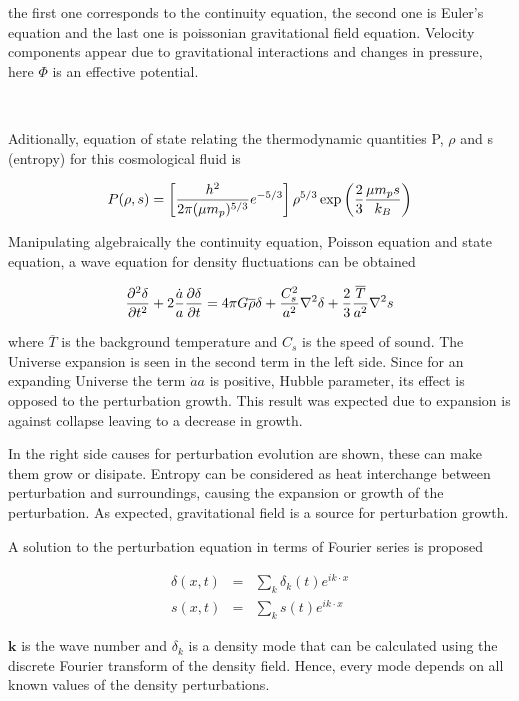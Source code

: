 the first one corresponds to the continuity equation, the second one is Euler's 
equation and the last one is poissonian gravitational field equation. Velocity 
components appear due to gravitational interactions and changes in pressure,
here $\Phi$ is an effective potential. 

\

Aditionally, equation of state relating the thermodynamic quantities P, 
$\rho$ and s (entropy) for this cosmological fluid is 

\begin{equation}
P(\rho,s)= \left[\frac{h^2}{2\pi(\mu m_p)^{5/3}}e^{-5/3}\right]\rho^{5/3}\exp \left(\frac{2}{3}\frac{\mu m_ps}{k_B}\right)
\label{ec.estado}
\end{equation}

Manipulating algebraically the continuity equation, Poisson equation and state equation,
a wave equation for density fluctuations can be obtained

\begin{equation}
\frac{\partial^2\delta}{\partial t^2}+2\frac{\dot{a}}{a}\frac{\partial \delta}{\partial t} =
4\pi G \overline{\rho}\delta + \frac{C_s^2}{a^2}\nabla^2\delta+\frac{2}{3}\frac{\overline{T}}{a^2}\nabla^2s
\label{onda}
\end{equation}

where $\overline{T}$ is the background temperature and $C_s$ is the speed of sound.
The Universe expansion is seen in the second term in the left side. Since for an expanding
Universe the term $\dot{a}{a}$ is positive, Hubble parameter, its effect is opposed to the 
perturbation growth. This result was expected due to expansion is against collapse leaving to
a decrease in growth. 	

In the right side causes for perturbation evolution are shown, these can make them grow 
or disipate. Entropy can be considered as heat interchange between perturbation and 
surroundings, causing the expansion or growth of the perturbation. As expected, 
gravitational field is a source for perturbation growth. 

A solution to the perturbation equation in terms of Fourier series is proposed

\begin{eqnarray}
\delta(x,t) &=& \sum_k \delta_k(t)e^{ik\cdot x} \nonumber\\
s(x,t) &=& \sum_k s(t)e^{ik\cdot x} \nonumber
\end{eqnarray}

$\textbf{k}$ is the wave number and $\delta_k$ is 
a density mode that can be calculated using the discrete Fourier transform
of the density field. Hence, every mode depends on all known values
of the density perturbations. 

